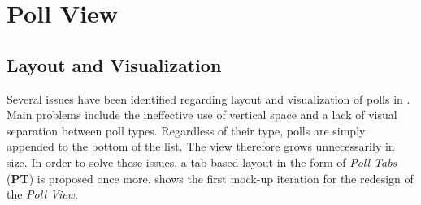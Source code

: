 \section{Poll View}
\label{section:con:proposals:pollview}

\subsection{Layout and Visualization}
Several issues have been identified regarding layout and visualization of polls in . Main problems include the ineffective use of vertical space and a lack of visual separation between poll types. Regardless of their type, polls are simply appended to the bottom of the list.
The view therefore grows unnecessarily in size. In order to solve these issues, a tab-based layout in the form of \emph{Poll Tabs} (\textbf{PT}) is proposed once more.  shows the first mock-up iteration for the redesign of the \emph{Poll View}.
